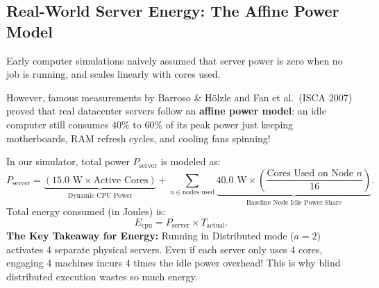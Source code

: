 \documentclass[11pt,a4paper]{article}
\begin{document}
\subsection{Real-World Server Energy: The Affine Power Model}
Early computer simulations naively assumed that server power is zero when no job is running, and scales linearly with cores used. 

However, famous measurements by Barroso \& H{\"o}lzle \cite{barroso2007power} and Fan et al.\ (ISCA 2007) \cite{fan2007power} proved that real datacenter servers follow an \textbf{affine power model}: an idle computer still consumes $40\%$ to $60\%$ of its peak power just keeping motherboards, RAM refresh cycles, and cooling fans spinning!

In our simulator, total power $P_{\text{server}}$ is modeled as:
\begin{equation}
    P_{\text{server}} = \underbrace{(15.0\text{ W} \times \text{Active Cores})}_{\text{Dynamic CPU Power}} + \sum_{n \in \text{nodes used}} \underbrace{40.0\text{ W} \times \left(\frac{\text{Cores Used on Node } n}{16}\right)}_{\text{Baseline Node Idle Power Share}}.
\end{equation}
Total energy consumed (in Joules) is:
\begin{equation}
    E_{\text{cpu}} = P_{\text{server}} \times T_{\text{actual}}.
\end{equation}
\textbf{The Key Takeaway for Energy:} Running in Distributed mode ($a=2$) activates 4 separate physical servers. Even if each server only uses 4 cores, engaging 4 machines incurs 4 times the idle power overhead! This is why blind distributed execution wastes so much energy.
\end{document}
